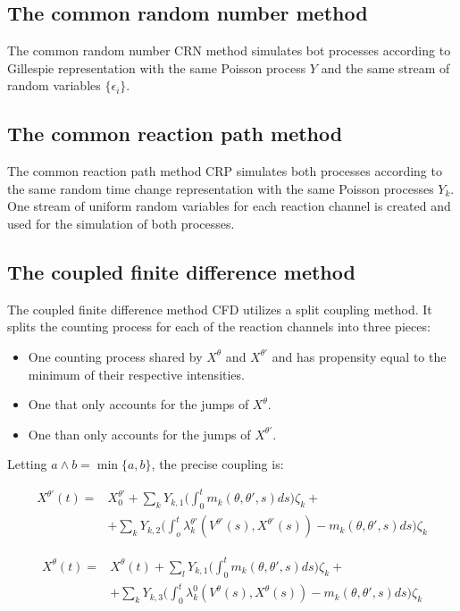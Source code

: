 	\subsection{The common random number method}
	The common random number CRN method simulates bot processes according to Gillespie representation with the same Poisson process $Y$ and the same stream of random variables $\{\epsilon_i\}$.

	\subsection{The common reaction path method}
	The common reaction path method CRP simulates both processes according to the same random time change representation with the same Poisson processes $Y_k$.
	One stream of uniform random variables for each reaction channel is created and used for the simulation of both processes.

	\subsection{The coupled finite difference method}
	The coupled finite difference method CFD utilizes a split coupling method.
	It splits the counting process for each of the reaction channels into three pieces:

	\begin{itemize}
		\item One counting process shared by $X^\theta$ and $X^{\theta'}$ and has propensity equal to the minimum of their respective intensities.
		\item One that only accounts for the jumps of $X^\theta$.
		\item One than only accounts for the jumps of $X^{\theta'}$.
	\end{itemize}

	Letting $a\land b = \min\{a, b\}$, the precise coupling is:

	\begin{align*}
		X^{\theta'}(t) = &X_0^{\theta'} + \sum\limits_kY_{k, 1}\biggl(\int_0^tm_k(\theta, \theta', s)ds\biggr)\zeta_k+\\
										 &+\sum\limits_{k}Y_{k, 2}\biggl(\int_o^t\lambda_k^{\theta'}(V^{\theta'}(s), X^{\theta'}(s))-m_k(\theta, \theta', s)ds\biggr)\zeta_k
	\end{align*}

	\begin{align*}
		X^\theta(t) = &X^\theta(t) + \sum\limits_{l}Y_{k,1}\biggl(\int_0^tm_k(\theta, \theta', s)ds\biggr)\zeta_k+\\
									&+\sum\limits_kY_{k, 3}\biggl(\int_0^t\lambda_k^0(V^\theta(s), X^\theta(s))-m_k(\theta, \theta', s)ds\biggr)\zeta_k
	\end{align*}

